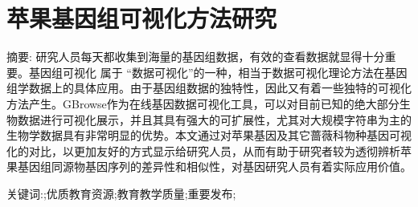 \chapter*{苹果基因组可视化方法研究}
\vspace{1em}
{\large {\heiti 摘要: }}\normalsize{\songti 
研究人员每天都收集到海量的基因组数据，有效的查看数据就显得十分重要。基因组可视化 属于 “数据可视化”的一种，相当于数据可视化理论方法在基因组学数据上的具体应用。由于基因组数据的独特性，因此又有着一些独特的可视化方法产生。GBrowse作为在线基因数据可视化工具，可以对目前已知的绝大部分生物数据进行可视化展示，并且其具有强大的可扩展性，尤其对大规模字符串为主的生物学数据具有非常明显的优势。本文通过对苹果基因及其它蔷薇科物种基因可视化的对比，以更加友好的方式显示给研究人员，从而有助于研究者较为透彻辨析苹果基因组同源物基因序列的差异性和相似性，对基因研究人员有着实际应用价值。
}

{\large {\heiti 关键词:}}\normalsize{;优质教育资源;教育教学质量;重要发布;}
\thispagestyle{empty}
